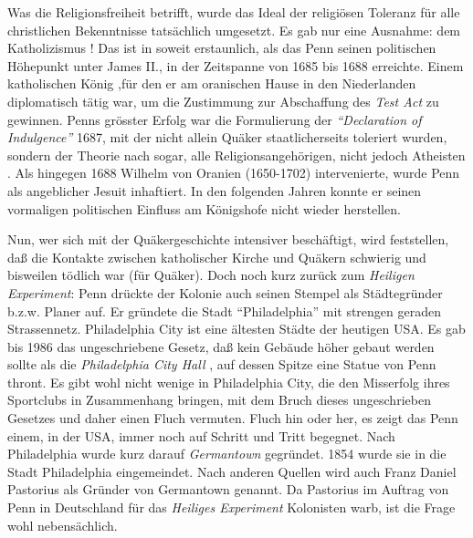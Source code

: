 \medskip

Was die Religionsfreiheit betrifft, wurde das Ideal der religiösen Toleranz für
alle
christlichen Bekenntnisse tatsächlich umgesetzt. Es gab nur eine Ausnahme: dem
Katholizismus ! Das ist in soweit erstaunlich, als das Penn
seinen politischen Höhepunkt unter James II.,
 in der Zeitspanne von 1685 bis 1688  erreichte. Einem
katholischen König ,für den er am oranischen Hause in
den Niederlanden
 diplomatisch tätig war, um die Zustimmung zur
Abschaffung des \textit{Test Act} zu gewinnen. Penns grösster
Erfolg war die Formulierung
der \textit{"`Declaration of Indulgence"'} 1687, mit der nicht allein Quäker
staatlicherseits toleriert wurden, sondern der Theorie nach sogar, alle
Religionsangehörigen, nicht jedoch Atheisten . Als
hingegen 1688 Wilhelm von Oranien (1650-1702)  intervenierte, wurde Penn als angeblicher
Jesuit inhaftiert. In den folgenden Jahren konnte er
seinen vormaligen politischen Einfluss am Königshofe  nicht
wieder herstellen.


\medskip

Nun, wer sich mit der Quäkergeschichte intensiver beschäftigt, wird feststellen,
daß die Kontakte zwischen katholischer Kirche und Quäkern schwierig und
bisweilen tödlich war (für Quäker). Doch noch kurz zurück zum \textit{Heiligen
Experiment}: Penn drückte der Kolonie auch seinen Stempel als Städtegründer
b.z.w. Planer auf. Er gründete die Stadt "`Philadelphia"' mit strengen geraden
Strassennetz. Philadelphia City ist eine ältesten Städte der heutigen USA. Es gab
bis 1986 das ungeschriebene Gesetz, daß kein Gebäude höher gebaut werden sollte
als die \textit{Philadelphia City Hall} ,
auf dessen Spitze eine Statue von Penn thront. Es gibt wohl nicht wenige in
Philadelphia City, die den Misserfolg ihres Sportclubs in Zusammenhang bringen,
mit dem Bruch dieses ungeschrieben Gesetzes und daher einen Fluch vermuten.
Fluch hin oder her, es zeigt das Penn einem, in der USA, immer noch auf
Schritt und Tritt
begegnet. Nach Philadelphia wurde kurz darauf  \textit{Germantown}
 gegründet. 1854 wurde sie in die Stadt Philadelphia
eingemeindet. Nach anderen Quellen wird auch Franz Daniel Pastorius als Gründer
von Germantown genannt. Da Pastorius im Auftrag von Penn in Deutschland für das
\textit{Heiliges Experiment} Kolonisten warb, ist die Frage wohl nebensächlich.

